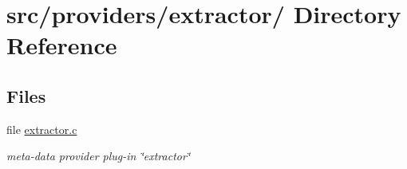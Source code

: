 \hypertarget{dir_000022}{
\section{src/providers/extractor/ Directory Reference}
\label{dir_000022}
}
\subsection*{Files}
\begin{CompactItemize}
\item 
file \hyperlink{extractor_8c}{extractor.c}
\begin{CompactList}\small\item\em meta-data provider plug-in \char`\"{}extractor\char`\"{} \item\end{CompactList}

\end{CompactItemize}

